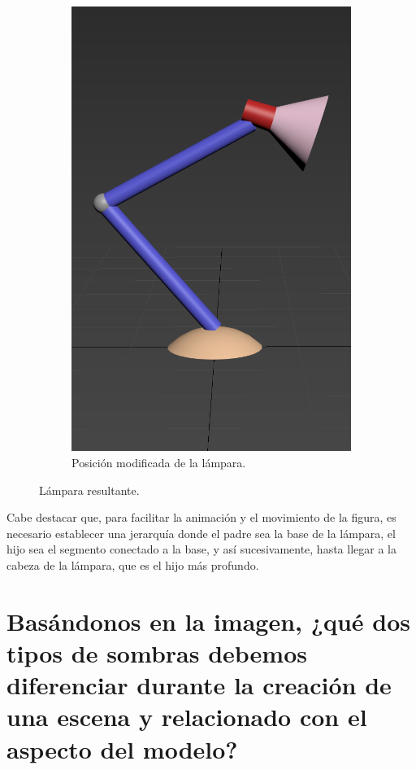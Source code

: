 \documentclass{article}
\begin{document}
\begin{figure}[H]
\begin{subfigure}[H]{0.38\textwidth}
\includegraphics[width=\textwidth]{imagenes/lamp2.png}
\caption{Posición modificada de la lámpara.}
     \end{subfigure}    
    \caption{Lámpara resultante.}
 \end{figure}

Cabe destacar que, para facilitar la animación y el movimiento de la figura, es necesario establecer una jerarquía donde el padre sea la base de la lámpara, el hijo sea el segmento conectado a la base, y así sucesivamente, hasta llegar a la cabeza de la lámpara, que es el hijo más profundo.

\section{Basándonos en la imagen, ¿qué dos tipos de sombras debemos diferenciar durante la creación de una escena y relacionado con el aspecto del modelo?}
\end{document}
